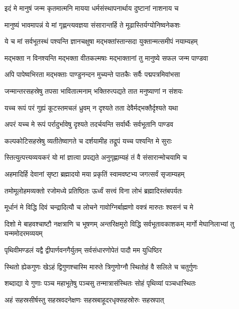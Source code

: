 \twolineshloka
{इदं मे मानुषं जन्म कृतमात्मनि मायया}
{धर्मसंस्थापनार्थाय दुष्टानां नाशनाय च}


\twolineshloka
{मानुष्यं भावमापन्नं ये मां गृह्णन्त्यवज्ञया}
{संसारान्तर्हि ते मूढास्तिर्यग्योनिष्वनेकशः}


\twolineshloka
{ये च मां सर्वभूतस्थं पश्यन्ति ज्ञानचक्षुषा}
{मद्भक्तांस्तान्सदा युक्तान्मत्समीपं नयाम्यहम्}


\twolineshloka
{मद्भक्ता न विनश्यन्ति मद्भक्ता वीतकल्मषाः}
{मद्भाक्तानां तु मानुष्ये सफल जन्म पाण्डवा}


\twolineshloka
{अपि पापेष्वभिरता मद्भक्ताः पाण्डुनन्दन}
{मुच्यन्ते पातकैः सर्वैः पद्मपत्रमिवांभसा}


\twolineshloka
{जन्मान्तरसहस्रेषु तपसा भावितात्मनाम्}
{भक्तिरुत्पद्यते तात मनुष्याणां न संशयः}


\twolineshloka
{यच्च रूपं परं गुह्यं कूटस्तमचलं ध्रुवम्}
{न दृश्यते तता देवैर्मद्भक्तैर्दृश्यते यथा}


\twolineshloka
{अपरं यच्च मे रूपं पर्रादुर्भावेषु दृश्यते}
{तदर्चयन्ति सर्वार्थैः सर्वभूतानि पाण्डव}


\twolineshloka
{कल्पकोटिसहस्रेषु व्यतीतेष्वागते च}
{दर्शयामीह तद्रूपं यच्च पश्यन्ति मे सुराः}


\twolineshloka
{स्तित्युत्पत्त्यव्ययकरं यो मां ज्ञात्वा प्रपद्यते}
{अनुगृह्णाम्यहं तं वै संसारान्मोचयामि च}


\twolineshloka
{अहमादिर्हि देवानां सृष्टा ब्रह्मादयो मया}
{प्रकृतिं स्वामवष्टभ्य जगत्सर्वं सृजाम्यहम्}


\twolineshloka
{तमोमूलोहमव्यक्तो रजोमध्ये प्रतिष्ठितः}
{ऊर्ध्वं सत्त्वं विना लोभं ब्रह्मादिस्तंबपर्यतः}


\twolineshloka
{मूर्धानं मे विद्धि दिवं चन्द्रादित्यौ च लोचने}
{गावोग्निर्बाह्मणो वक्त्रं मारुतः श्वसनं च मे}


\threelineshloka
{दिशो मे बाहवश्चाष्टौ नक्षत्राणि च भूषणम्}
{अन्तरिक्षमुरो विद्धि सर्वभूतावकाशकम्}
{मार्गो मेघानिलाभ्यां तु यन्ममोदरमव्ययम्}


\twolineshloka
{पृथिवीमण्डलं यद्वै द्वीपार्णवनगैर्युतम्}
{सर्वसंधारणोपेतं पादौ मम युधिष्ठिर}


\twolineshloka
{स्थितो ह्येकगुणः खेऽहं द्विगुणश्चास्मि मारुते}
{त्रिगुणोग्नौ स्थितोहं वै सलिले च चतुर्गुणः}


\twolineshloka
{शब्दाद्या ये गुणाः पञ्च महाभूतेषु पञ्चसु}
{तन्मात्रासंस्थितः सोहं पृथिव्यां पञ्चधास्थितः}


\twolineshloka
{अहं सहस्रसीर्षस्तु सहस्रवदनेक्षणः}
{सहस्रबाहूदरधृक्सहस्रोरुः सहस्रपात्}


